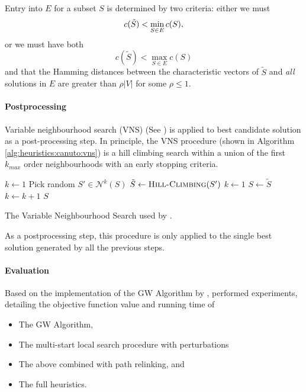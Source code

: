  Entry into $E$ for a subset $S$ is determined by two criteria:
 either we must
 \[c(\tilde{S}) < \min_{S \in E} c(S)\mathnormal{,}\]
 or we must have both
 \[c(\tilde{S}) < \max_{S \in E} c(S)\]
  and that the Hamming distances between the characteristic vectors of $\tilde{S}$
   and \textit{all} solutions in $E$ are greater than $\rho |V|$ for some $\rho \leq 1$. 

\paragraph{Postprocessing}
Variable neighbourhood search (VNS) (See \citet{hansen2010variable}) is applied
to best candidate solution as a post-processing step. In principle, the VNS
procedure (shown in Algorithm \ref{alg:heuristics:canuto:vns}) is a hill climbing
search within a union of the first $k_{max}$ order neighbourhoods with an early stopping
 criteria.
\begin{algorithm}[h!]
   \begin{algorithmic}[1]
     \State $k \gets 1$
     \State Pick random $S' \in \mathcal{N}^k(S)$
     \State $\tilde{S} \gets \Call{Hill-Climbing}{S'}$
     \State $k \gets 1$
     \State $S \gets \tilde{S}$
     \Else
     \State $k \gets k + 1$
     \EndIf
     \EndWhile
     \EndFor
     \State \Return $S$
     \EndProcedure
 \end{algorithmic}
 \caption{The Variable Neighbourhood Search
   used by \citet{canuto2001local}.}\label{alg:heuristics:canuto:vns}
 \end{algorithm}

 As a postprocessing step, this procedure is only applied to the single best solution generated
  by all the previous steps.
\paragraph{Evaluation}
Based on the implementation of the GW Algorithm by \citet{Johnson:2000:PCS:338219.338637},
\citet{canuto2001local} performed experiments, detailing the objective function value
and running time of
\begin{itemize}
\item The GW Algorithm,
\item The multi-start local search procedure with perturbations
\item The above combined with path relinking, and
\item The full heuristics.
\end{itemize}

